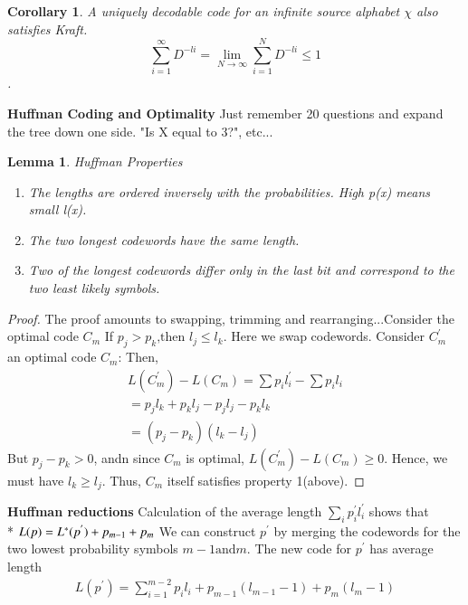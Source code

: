 \documentclass[10pt]{article}
\newtheorem{lemma}{Lemma}[section]
\newtheorem{corollary}{Corollary}[section]
\begin{document}
\begin{tiny}
\begin{multicols}{3}
\begin{corollary}A uniquely decodable code for an infinite source alphabet $\chi$ also satisfies Kraft. 
\[\sum_{i=1}^{\infty}D^{-li} = \lim_{N\rightarrow\infty}\sum_{i=1}^{N}D^{-li} \leq 1\].
\end{corollary}




\textbf{\scriptsize Huffman Coding and Optimality}
Just remember 20 questions and expand the tree down one side. "Is X equal to 3?", etc...
\begin{lemma}{Huffman Properties}\label{huffman}
\begin{enumerate}
	\item {\it The lengths are ordered inversely with the probabilities. High p(x) means small l(x).}
	\item {\it The two longest codewords have the same length.}
	\item {\it Two of the longest codewords differ only in the last bit and correspond to the two least likely symbols.}
\end{enumerate}
\end{lemma}
\begin{proof} The proof amounts to swapping, trimming and rearranging...Consider the optimal code ${C_m}$
If ${p_j} > {p_k} \text{,then } {l_j} \leq {l_k}$. Here we swap codewords. Consider $C_m^{'}$ an optimal code ${C_m}$:
Then, 
\begin{eqnarray}
L(C_m^{'}) - L(C_m) = \sum {p_i}{l_i^{'}} - \sum {p_i}{l_i} \\
={p_j}{l_k}+{p_k}{l_j} - {p_j}{l_j} - {p_k}{l_k}\\
=({p_j}-{p_k})({l_k}-{l_j})
\end{eqnarray}
But ${p_j} - {p_k} > 0$, andn since ${C_m}$ is optimal, $L(C_m^{'}) - L(C_m) \geq 0$.
Hence, we must have ${l_k} \geq {l_j}$. Thus, ${C_m}$ itself satisfies property 1(above).
\end{proof}
\textbf{\scriptsize Huffman reductions}
Calculation of the average length $\sum_i {p_i^{'}}{l_i^{'}}$ shows that \\*
$L(p) = L^{*}(p^{'})+p_{m-1} + p_m\\$
We can construct ${p^{'}}$ by merging the codewords for the two lowest probability symbols
${m-1} \text{and} {m}$.  The new code for ${p^{'}}$ has average length
\begin{eqnarray}
L(p^{'}) = \sum_{i=1}^{m-2} p_i l_i + p_{m-1}(l_{m-1} -1 )+p_{m}(l_{m} -1)\\

\end{eqnarray}
\end{multicols}
\end{tiny}
\end{document}
